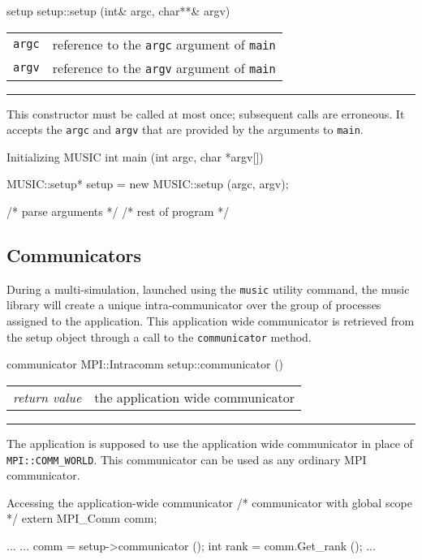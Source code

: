 \documentclass[a4paper]{report}
\makeatletter
\newenvironment{parameters}%
{\begin{tabular}{@{\hspace{2em}}lp{0.6\textwidth}}}%
{\end{tabular}\par\vspace{1mm}\par\hrule\par\vspace{5mm}}
\makeatother
\begin{document}
\begin{head}{setup}
  setup::setup (int& argc, char**& argv)
\end{head}
\begin{parameters}
  \lstinline|argc| &%
  reference to the \lstinline|argc| argument of \lstinline|main| \\
  \lstinline|argv| &%
  reference to the \lstinline|argv| argument of \lstinline|main| \\
\end{parameters}

This constructor must be called at most once; subsequent calls are
erroneous.  It accepts the \lstinline|argc| and \lstinline|argv| that are
provided by the arguments to \lstinline|main|.

\pagebreak
\begin{code}{Initializing MUSIC}
int main (int argc, char *argv[])
{
  MUSIC::setup* setup = new MUSIC::setup (argc, argv);

  /* parse arguments */
  /* rest of program */
}
\end{code}

\subsection{Communicators}

During a multi-simulation, launched using the \lstinline|music|
utility command, the music library will create a unique
intra-communicator over the group of processes assigned to the
application.  This application wide communicator is retrieved from the
setup object through a call to the
\lstinline|communicator| method.

\begin{head}{communicator}
  MPI::Intracomm setup::communicator ()
\end{head}
\begin{parameters}
  \emph{return value} & the application wide communicator \\
\end{parameters}

The application is supposed to use the application wide communicator
in place of
\lstinline|MPI::COMM_WORLD|.
This communicator can be used as any ordinary MPI communicator.

\begin{code}{Accessing the application-wide communicator}
/* communicator with global scope */
extern MPI_Comm comm;

...
{
  ...
  comm = setup->communicator ();
  int rank = comm.Get_rank ();
  ...
}
\end{code}
\end{document}

